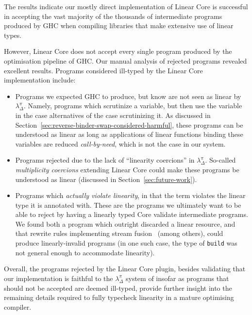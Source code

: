 \documentclass[acmsmall,review,anonymous,screen]{acmart}
\begin{document}
{\small
  
  }
%
The results indicate our mostly direct implementation of Linear Core is
successful in accepting the vast majority of the thousands of intermediate
programs produced by GHC when compiling libraries that make extensive use of
linear types.

However, Linear Core does not accept every single program produced by the
optimisation pipeline of GHC. Our manual analysis of rejected programs revealed
excellent results. Programs considered ill-typed by the Linear Core
implementation include:
%
\begin{itemize}
    \item Programs we expected GHC to produce, but know are not seen as linear by $\lambda^\pi_\Delta$.
        Namely, programs which scrutinize a variable, but then use the variable in the
        case alternatives of the case scrutinizing it. As discussed in
        Section~\ref{sec:reverse-binder-swap-considered-harmful}, these programs can be
        understood as linear as long as applications of linear functions binding these
        variables are reduced \emph{call-by-need}, which is not the case in our system.

    \item Programs rejected due to the lack of ``linearity coercions'' in
        $\lambda^\pi_\Delta$. So-called \emph{multiplicity coercions} extending
        Linear Core could make these programs be understood as linear
        (discussed in Section~\ref{sec:future-work}).

    \item Programs which \emph{actually violate linearity}, in that the term
        violates the linear type it is annotated with. These are the programs
        we ultimately want to be able to reject by having a linearly typed Core
        validate intermediate programs. We found both a program which outright
        discarded a linear resource, and that rewrite rules implementing stream
        fusion~\cite{10.1145/165180.165214,10.1145/1291151.1291199}
        (among others), could produce linearly-invalid programs (in one such case,
        the type of \lstinline{build} was not general enough to accommodate linearity).
\end{itemize}
%
Overall, the programs rejected by the Linear Core plugin,
besides validating that our implementation is faithful to the
$\lambda^\pi_\Delta$ system of insofar as programs that should not be accepted
are deemed ill-typed, provide further insight into the remaining
details required to fully typecheck linearity in a mature optimising compiler.
\end{document}
